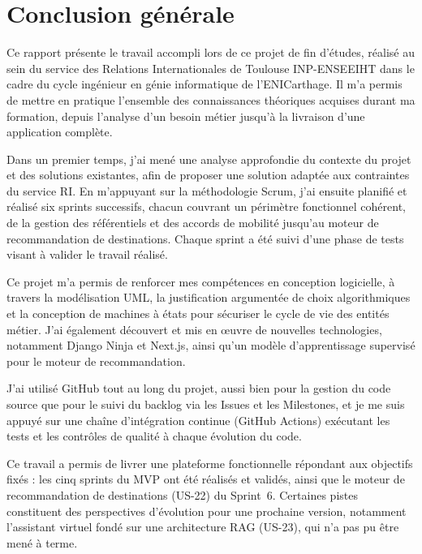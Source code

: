 \chapter*{Conclusion générale}
\justifying

Ce rapport présente le travail accompli lors de ce projet de fin d'études, réalisé au sein du service des Relations Internationales de Toulouse INP-ENSEEIHT dans le cadre du cycle ingénieur en génie informatique de l'ENICarthage. Il m'a permis de mettre en pratique l'ensemble des connaissances théoriques acquises durant ma formation, depuis l'analyse d'un besoin métier jusqu'à la livraison d'une application complète.

Dans un premier temps, j'ai mené une analyse approfondie du contexte du projet et des solutions existantes, afin de proposer une solution adaptée aux contraintes du service RI. En m'appuyant sur la méthodologie Scrum, j'ai ensuite planifié et réalisé six sprints successifs, chacun couvrant un périmètre fonctionnel cohérent, de la gestion des référentiels et des accords de mobilité jusqu'au moteur de recommandation de destinations. Chaque sprint a été suivi d'une phase de tests visant à valider le travail réalisé.

Ce projet m'a permis de renforcer mes compétences en conception logicielle, à travers la modélisation UML, la justification argumentée de choix algorithmiques et la conception de machines à états pour sécuriser le cycle de vie des entités métier. J'ai également découvert et mis en œuvre de nouvelles technologies, notamment Django Ninja et Next.js, ainsi qu'un modèle d'apprentissage supervisé pour le moteur de recommandation.

J'ai utilisé GitHub tout au long du projet, aussi bien pour la gestion du code source que pour le suivi du backlog via les Issues et les Milestones, et je me suis appuyé sur une chaîne d'intégration continue (GitHub Actions) exécutant les tests et les contrôles de qualité à chaque évolution du code.

Ce travail a permis de livrer une plateforme fonctionnelle répondant aux objectifs fixés : les cinq sprints du MVP ont été réalisés et validés, ainsi que le moteur de recommandation de destinations (US-22) du Sprint~6. Certaines pistes constituent des perspectives d'évolution pour une prochaine version, notamment l'assistant virtuel fondé sur une architecture RAG (US-23), qui n'a pas pu être mené à terme.

